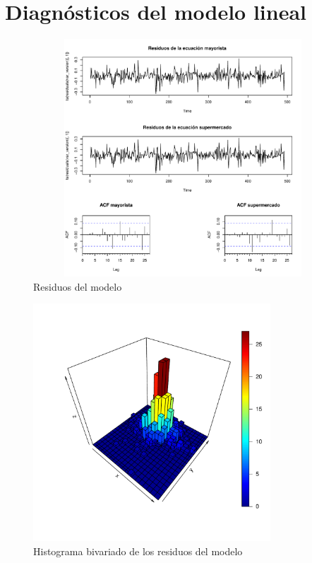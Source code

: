 \documentclass[12pt, twoside]{book}\usepackage[]{graphicx}\usepackage[]{color}
\newenvironment{knitrout}{}{} %
\numberwithin{equation}{section}
\numberwithin{theorem}{section}
\numberwithin{teorema}{section}
\numberwithin{defi}{section}
\numberwithin{prop}{section}
\numberwithin{defi}{section}
\theoremstyle{plain}
\begin{document}
\section{Diagnósticos del modelo lineal}

\begin{knitrout}
\color{fgcolor}\begin{figure}[!htpb]

{\centering \includegraphics[width=4.5in,height=3.5in]{figure/graph5_8-1} 

}

\caption{Residuos del modelo\label{graph5.8}}\label{fig:graph5.8}
\end{figure}


\end{knitrout}




\begin{knitrout}
\color{fgcolor}\begin{figure}[!htpb]

{\centering \includegraphics[width=3.5in,height=3.5in]{figure/fig-5_3_1-1} 

}

\caption[Histograma bivariado de los residuos del modelo]{Histograma bivariado de los residuos del modelo}\label{fig:fig-5.3.1}
\end{figure}


\end{knitrout}
\end{document}

